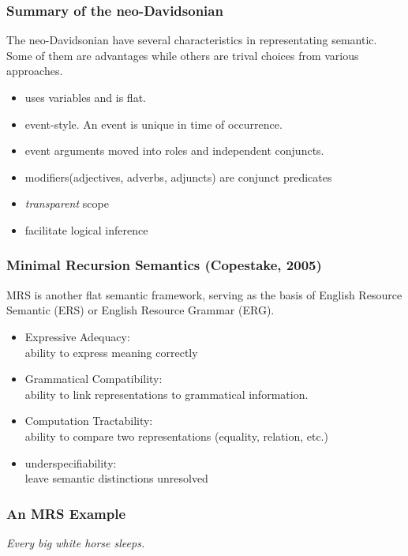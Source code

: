 \documentclass{beamer}
\begin{document}
\begin{frame}
    \frametitle{Summary of the neo-Davidsonian}

    The neo-Davidsonian have several characteristics in representating semantic.
    Some of them are advantages while others are trival choices from various approaches.

    \begin{itemize}
        \item uses variables and is flat.
        \item \alert{event}-style. An event is unique in time of occurrence.
        \item event arguments moved into roles and independent conjuncts.
        \item modifiers(adjectives, adverbs, adjuncts) are conjunct predicates
        \item \emph{transparent} scope
        \item facilitate logical inference
    \end{itemize}

\end{frame}

\begin{frame}
    \frametitle{Minimal Recursion Semantics (Copestake, 2005)}

    MRS is another \alert{flat} semantic framework,
    serving as the basis of English Resource Semantic (ERS) or English Resource Grammar (ERG).

    \begin{itemize}
        \item Expressive Adequacy: \\
            ability to express meaning correctly
        \item Grammatical Compatibility: \\
            ability to link representations to grammatical information.
        \item Computation Tractability: \\
            ability to compare two representations (equality, relation, etc.)
        \item \alert{underspecifiability}: \\
            leave semantic distinctions unresolved
    \end{itemize}
\end{frame}

\begin{frame}
    \frametitle{An MRS Example}

    \emph{Every big white horse sleeps.}

    \begin{center}
    \end{center}
\end{frame}
\end{document}
